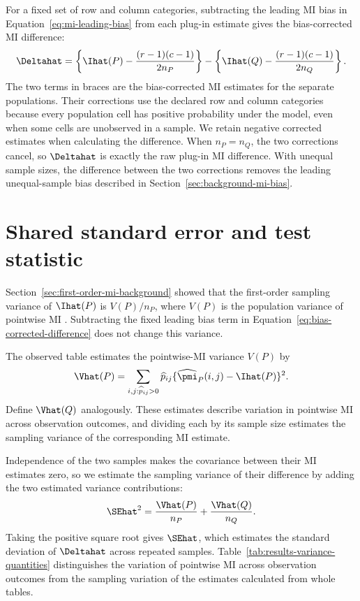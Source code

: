 For a fixed set of row and column categories, subtracting the leading MI bias in
Equation~\eqref{eq:mi-leading-bias} \citep{miller1955,moddemeijer1989}
from each plug-in estimate gives the bias-corrected MI difference:
\begin{equation}
  \Deltahat
  =\left\{\Ihat(P)-\frac{(r-1)(c-1)}{2n_P}\right\}
  -\left\{\Ihat(Q)-\frac{(r-1)(c-1)}{2n_Q}\right\}.
  \label{eq:bias-corrected-difference}
\end{equation}
The two terms in braces are the bias-corrected MI estimates for the
separate populations. Their corrections use the declared row and column
categories because every population cell has positive probability under
the model, even when some cells are unobserved in a sample. We retain
negative corrected estimates when calculating the difference.
When \(n_P=n_Q\), the two corrections cancel, so \(\Deltahat\) is exactly
the raw plug-in MI difference. With unequal sample sizes, the difference
between the two corrections removes the leading unequal-sample bias described in
Section~\ref{sec:background-mi-bias}.

\section{Shared standard error and test statistic}

Section~\ref{sec:first-order-mi-background} showed that the first-order
sampling variance of \(\Ihat(P)\) is \(V(P)/n_P\), where \(V(P)\) is the
population variance of pointwise MI \citep{moddemeijer1989,brillinger2004}.
Subtracting the fixed leading bias term
in Equation~\eqref{eq:bias-corrected-difference} does not change this
variance.

The observed table estimates the pointwise-MI variance \(V(P)\) by
\begin{equation}
  \Vhat(P)
  =\sum_{i,j:\widehat p_{ij}>0}
  \widehat p_{ij}
  \{\widehat\pmi_P(i,j)-\Ihat(P)\}^2.
  \label{eq:estimated-mi-variance}
\end{equation}
Define \(\Vhat(Q)\) analogously.
These estimates describe variation in pointwise MI across observation
outcomes, and dividing each by its sample size estimates the sampling variance
of the corresponding MI estimate.

Independence of the two samples makes the covariance between their MI
estimates zero, so we estimate the sampling variance of their difference
by adding the two estimated variance contributions:
\begin{equation}
  \SEhat^2
  =\frac{\Vhat(P)}{n_P}
  +\frac{\Vhat(Q)}{n_Q}.
  \label{eq:shared-se}
\end{equation}
Taking the positive square root gives \(\SEhat\), which estimates the
standard deviation of \(\Deltahat\) across repeated samples.
Table~\ref{tab:results-variance-quantities} distinguishes the variation of
pointwise MI across observation outcomes from the sampling variation of
the estimates calculated from whole tables.


